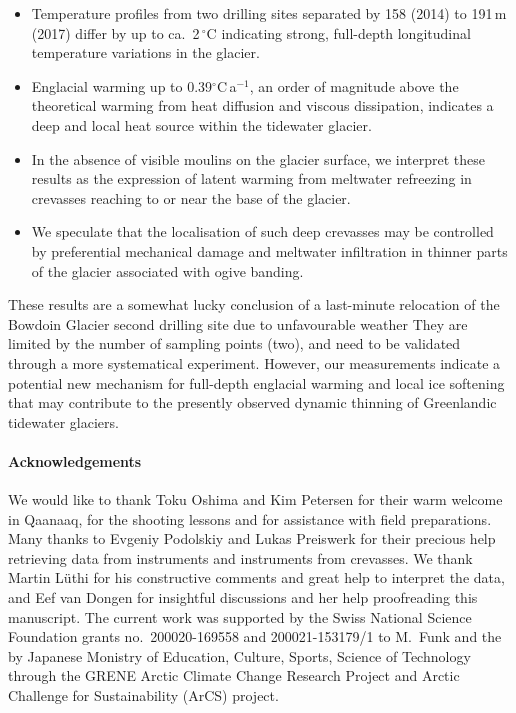 \documentclass[utf8]{article}
\begin{document}
    \begin{itemize}

      \item Temperature profiles from two drilling sites separated by 158
        (2014) to 191\,m (2017) differ by up to ca.~2\,$^\circ$C indicating
        strong, full-depth longitudinal temperature variations in the glacier.

      \item Englacial warming up to 0.39$^\circ$C\,a$^{-1}$, an order of
        magnitude above the theoretical warming from heat diffusion and viscous
        dissipation, indicates a deep and local heat source within the
        tidewater glacier.

      \item In the absence of visible moulins on the glacier surface, we interpret
        these results as the expression of latent warming from meltwater
        refreezing in crevasses reaching to or near the base of the glacier.

      \item We speculate that the localisation of such deep crevasses may be
        controlled by preferential mechanical damage and meltwater infiltration
        in thinner parts of the glacier associated with ogive banding.

    \end{itemize}

    These results are a somewhat lucky conclusion of a last-minute relocation
    of the Bowdoin Glacier second drilling site due to unfavourable weather
    They are limited by the number of sampling points (two), and need to
    be validated through a more systematical experiment. However, our
    measurements indicate
    a potential new mechanism for full-depth englacial warming and local
    ice softening that may contribute to the presently observed dynamic
    thinning of Greenlandic tidewater glaciers.



\paragraph{Acknowledgements}

    We would like to thank Toku Oshima and Kim Petersen for their warm welcome
    in Qaanaaq, for the shooting lessons and for assistance with field
    preparations. Many thanks to Evgeniy Podolskiy and Lukas Preiswerk for
    their precious help retrieving data from instruments and instruments from
    crevasses. We thank Martin Lüthi for his constructive comments and great
    help to interpret the data, and Eef van Dongen for insightful discussions
    and her help proofreading this manuscript.
    The current work was supported by the Swiss National Science Foundation
    grants no.~200020-169558 and 200021-153179/1 to M.~Funk and the by Japanese
    Monistry of Education, Culture, Sports, Science of Technology through
    the GRENE Arctic Climate Change Research Project and Arctic Challenge for
    Sustainability (ArCS) project.
\end{document}
